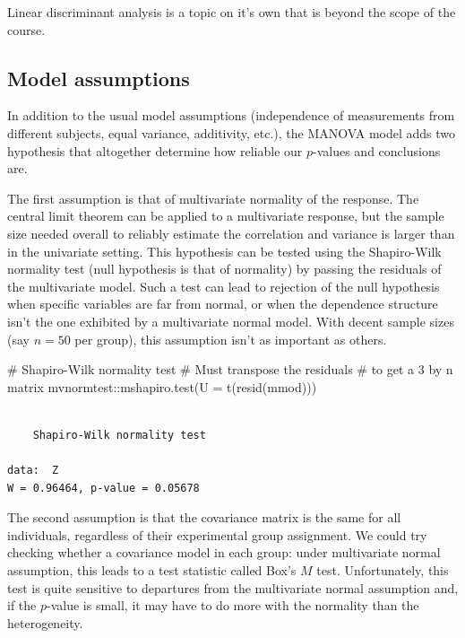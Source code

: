 \documentclass[
  11pt,
  letterpaper,
]{scrbook}
\newenvironment{Shaded}{\begin{snugshade}}{\end{snugshade}}
\newcommand{\AttributeTok}[1]{\textcolor[rgb]{0.40,0.45,0.13}{#1}}
\newcommand{\CommentTok}[1]{\textcolor[rgb]{0.37,0.37,0.37}{#1}}
\newcommand{\FunctionTok}[1]{\textcolor[rgb]{0.28,0.35,0.67}{#1}}
\newcommand{\NormalTok}[1]{\textcolor[rgb]{0.00,0.23,0.31}{#1}}
\newcommand{\SpecialCharTok}[1]{\textcolor[rgb]{0.37,0.37,0.37}{#1}}
\theoremstyle{definition}
\theoremstyle{remark}
\begin{document}
Linear discriminant analysis is a topic on it's own that is beyond the
scope of the course.

\hypertarget{model-assumptions-1}{%
\subsection{Model assumptions}\label{model-assumptions-1}}

In addition to the usual model assumptions (independence of measurements
from different subjects, equal variance, additivity, etc.), the MANOVA
model adds two hypothesis that altogether determine how reliable our
\(p\)-values and conclusions are.

The first assumption is that of multivariate normality of the response.
The central limit theorem can be applied to a multivariate response, but
the sample size needed overall to reliably estimate the correlation and
variance is larger than in the univariate setting. This hypothesis can
be tested using the Shapiro-Wilk normality test (null hypothesis is that
of normality) by passing the residuals of the multivariate model. Such a
test can lead to rejection of the null hypothesis when specific
variables are far from normal, or when the dependence structure isn't
the one exhibited by a multivariate normal model. With decent sample
sizes (say \(n=50\) per group), this assumption isn't as important as
others.

\begin{Shaded}
\begin{Highlighting}[]
\CommentTok{\# Shapiro{-}Wilk normality test}
\CommentTok{\# Must transpose the residuals }
\CommentTok{\# to get a 3 by n matrix}
\NormalTok{mvnormtest}\SpecialCharTok{::}\FunctionTok{mshapiro.test}\NormalTok{(}\AttributeTok{U =} \FunctionTok{t}\NormalTok{(}\FunctionTok{resid}\NormalTok{(mmod)))}
\end{Highlighting}
\end{Shaded}

\begin{verbatim}

    Shapiro-Wilk normality test

data:  Z
W = 0.96464, p-value = 0.05678
\end{verbatim}

The second assumption is that the covariance matrix is the same for all
individuals, regardless of their experimental group assignment. We could
try checking whether a covariance model in each group: under
multivariate normal assumption, this leads to a test statistic called
Box's \(M\) test. Unfortunately, this test is quite sensitive to
departures from the multivariate normal assumption and, if the
\(p\)-value is small, it may have to do more with the normality than the
heterogeneity.
\end{document}
